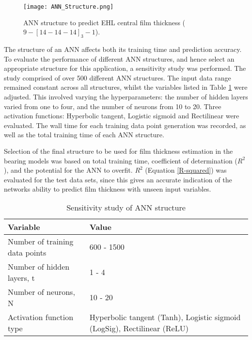\begin{figure}
	\centering  
	\texttt{[image: ANN\_Structure.png]}
	\caption{ANN structure to predict EHL central film thickness ($9-[14-14-14]_3-1$).}
	\label{ANN structure}
\end{figure} 

The structure of an ANN affects both its training time and prediction accuracy. To evaluate the performance of different ANN structures, and hence select an appropriate structure for this application, a sensitivity study was performed. The study comprised of over 500 different ANN structures. The input data range remained constant across all structures, whilst the variables listed in Table \ref{Sensitivity study of ANN structure} were adjusted. This involved varying the hyperparameters: the number of hidden layers varied from one to four, and the number of neurons from 10 to 20. Three activation functions: Hyperbolic tangent, Logistic sigmoid and Rectilinear were evaluated. The wall time for each training data point generation was recorded, as well as the total training time of each ANN structure.

Selection of the final structure to be used for film thickness estimation in the bearing models was based on total training time, coefficient of determination ($R^2$), and the potential for the ANN to overfit. $R^2$ (Equation \ref{R-squared}) was evaluated for the test data sets, since this gives an accurate indication of the networks ability to predict film thickness with unseen input variables.

\begin{table*}
	\caption{Sensitivity study of ANN structure}
	\label{Sensitivity study of ANN structure}
	\centering
	\renewcommand{\arraystretch}{1.5}%
	\begin{tabular}{|P{0.4\textwidth}|P{0.4\textwidth}|}
		\hline
		\textbf{Variable} & \textbf{Value} \\ [0.5ex]
		\hline
		Number of training data points & 600 - 1500 \\ [0.5ex]
		\hline
		Number of hidden layers, t & 1 - 4 \\ [0.5ex]
		\hline
		Number of neurons, N & 10 - 20 \\ [0.5ex]
	    \hline
		Activation function type & Hyperbolic tangent (Tanh), Logistic sigmoid (LogSig), Rectilinear (ReLU) \\ [0.5ex]
		\hline
	\end{tabular}
\end{table*}

